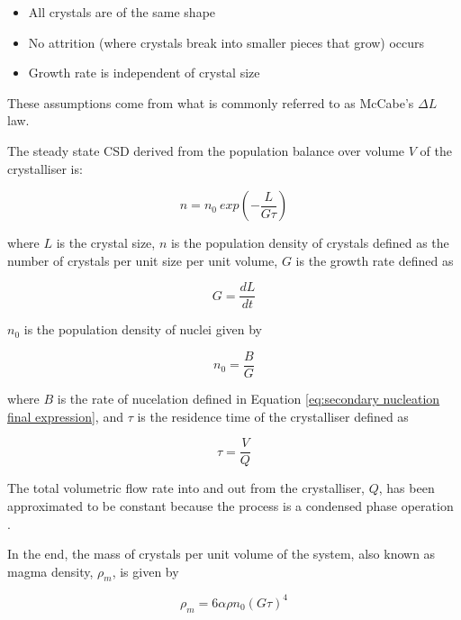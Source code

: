 \begin{itemize}
    \item All crystals are of the same shape
    \item No attrition (where crystals break into smaller pieces that grow) occurs
    \item Growth rate is independent of crystal size
\end{itemize}

\noindent These assumptions come from what is commonly referred to as McCabe's $\Delta L$ law. 

The steady state CSD derived from the population balance over volume $V$ of the crystalliser is:

\begin{equation}
    n = n_0 ~exp(-\frac{L}{G\tau})
\end{equation}

\noindent where $L$ is the crystal size, $n$ is the population density of crystals defined as the number of crystals per unit size per unit volume, $G$ is the growth rate defined as 

\begin{equation}
    G = \frac{dL}{dt}
\end{equation}

\noindent $n_0$ is the population density of nuclei given by 

\begin{equation}
    n_0 = \frac{B}{G}
\end{equation}

\noindent where $B$ is the rate of nucelation defined in Equation \ref{eq:secondary nucleation final expression}, and $\tau$ is the residence time of the crystalliser defined as 

\begin{equation}
    \tau = \frac{V}{Q}
\end{equation}

\noindent The total volumetric flow rate into and out from the crystalliser, $Q$, has been approximated to be constant because the process is a condensed phase operation \cite{levenspiel_chemical_1999}. 

In the end, the mass of crystals per unit volume of the system, also known as magma density, $\rho_m$, is given by

\begin{equation} \label{eq:magma density}
    \rho_m = 6 \alpha \rho n_0 (G \tau)^4
\end{equation}

